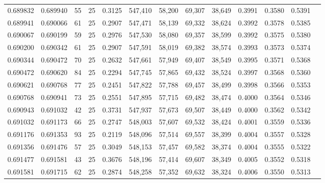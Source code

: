 \begin{tabular}{rrrrrrrrrrrrr}
0.689832 & 0.689940 &    55 &  25 &                                     0.3125 & 547,410 &  58,200 &  69,307 &  38,649 & 0.3991 & 0.3580 & 0.5391 \\
0.689941 & 0.690066 &    61 &  25 &                                     0.2907 & 547,471 &  58,139 &  69,332 &  38,624 & 0.3992 & 0.3578 & 0.5385 \\
0.690067 & 0.690199 &    59 &  25 &                                     0.2976 & 547,530 &  58,080 &  69,357 &  38,599 & 0.3992 & 0.3575 & 0.5380 \\
0.690200 & 0.690342 &    61 &  25 &                                     0.2907 & 547,591 &  58,019 &  69,382 &  38,574 & 0.3993 & 0.3573 & 0.5374 \\
0.690344 & 0.690472 &    70 &  25 &                                     0.2632 & 547,661 &  57,949 &  69,407 &  38,549 & 0.3995 & 0.3571 & 0.5368 \\
0.690472 & 0.690620 &    84 &  25 &                                     0.2294 & 547,745 &  57,865 &  69,432 &  38,524 & 0.3997 & 0.3568 & 0.5360 \\
0.690621 & 0.690768 &    77 &  25 &                                     0.2451 & 547,822 &  57,788 &  69,457 &  38,499 & 0.3998 & 0.3566 & 0.5353 \\
0.690768 & 0.690941 &    73 &  25 &                                     0.2551 & 547,895 &  57,715 &  69,482 &  38,474 & 0.4000 & 0.3564 & 0.5346 \\
0.690943 & 0.691032 &    42 &  25 &                                     0.3731 & 547,937 &  57,673 &  69,507 &  38,449 & 0.4000 & 0.3562 & 0.5342 \\
0.691032 & 0.691173 &    66 &  25 &                                     0.2747 & 548,003 &  57,607 &  69,532 &  38,424 & 0.4001 & 0.3559 & 0.5336 \\
0.691176 & 0.691353 &    93 &  25 &                                     0.2119 & 548,096 &  57,514 &  69,557 &  38,399 & 0.4004 & 0.3557 & 0.5328 \\
0.691356 & 0.691476 &    57 &  25 &                                     0.3049 & 548,153 &  57,457 &  69,582 &  38,374 & 0.4004 & 0.3555 & 0.5322 \\
0.691477 & 0.691581 &    43 &  25 &                                     0.3676 & 548,196 &  57,414 &  69,607 &  38,349 & 0.4005 & 0.3552 & 0.5318 \\
0.691581 & 0.691715 &    62 &  25 &                                     0.2874 & 548,258 &  57,352 &  69,632 &  38,324 & 0.4006 & 0.3550 & 0.5313 \\

\end{tabular}
